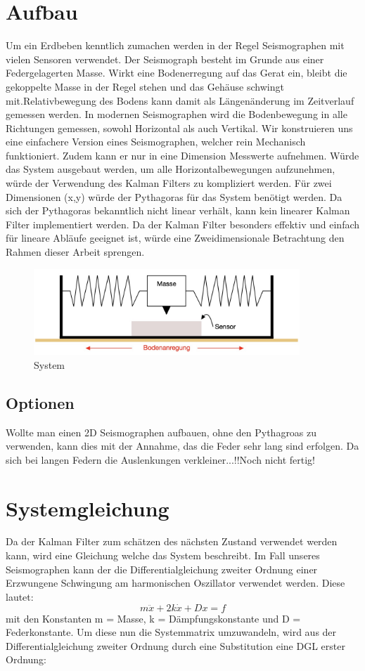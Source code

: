 \documentclass[11pt,a4paper]{article}
\begin{document}
\section{Aufbau}
Um ein Erdbeben kenntlich zumachen werden in der Regel Seismographen mit vielen Sensoren verwendet. 
Der Seismograph besteht im Grunde aus einer Federgelagerten Masse. Wirkt eine Bodenerregung auf das Gerat ein, bleibt die gekoppelte Masse in der Regel stehen und das Gehäuse schwingt mit.Relativbewegung des Bodens kann damit als Längenänderung im Zeitverlauf gemessen werden. In modernen Seismographen wird die Bodenbewegung in alle Richtungen gemessen, sowohl Horizontal als auch Vertikal. 
Wir konstruieren uns eine einfachere Version eines Seismographen, welcher rein Mechanisch funktioniert. Zudem kann er nur in eine Dimension Messwerte aufnehmen. Würde das System ausgebaut werden, um alle Horizontalbewegungen aufzunehmen, würde der Verwendung des Kalman Filters zu kompliziert werden. Für zwei Dimensionen (x,y) würde der Pythagoras für das System benötigt werden. Da sich der Pythagoras bekanntlich nicht linear verhält, kann kein linearer Kalman Filter implementiert werden. Da der Kalman Filter besonders effektiv und einfach für lineare Abläufe geeignet ist, würde eine Zweidimensionale Betrachtung den Rahmen dieser Arbeit sprengen. 
\begin{figure}[h]
 \begin{center}
 \includegraphics[width=10cm]{Apperatur}
 \caption{System}
 \end{center}
\end{figure}


\subsection{Optionen}
Wollte man einen 2D Seismographen aufbauen, ohne den Pythagroas zu verwenden, kann dies mit der Annahme, das die Feder sehr lang sind erfolgen. Da sich bei langen Federn die Auslenkungen verkleiner...!!Noch nicht fertig!

\section{Systemgleichung}
Da der Kalman Filter zum schätzen des nächsten Zustand verwendet werden kann, wird eine Gleichung welche das System beschreibt. Im Fall unseres Seismographen kann der die Differentialgleichung zweiter Ordnung einer Erzwungene Schwingung am harmonischen Oszillator verwendet werden. Diese lautet:
\begin{equation}
m\ddot x + 2k \dot x + Dx = f
\end{equation}
mit den Konstanten m = Masse, k = Dämpfungskonstante und D  = Federkonstante.
Um diese nun die Systemmatrix umzuwandeln, wird aus der Differentialgleichung zweiter Ordnung durch eine Substitution eine DGL erster Ordnung:
\end{document}
